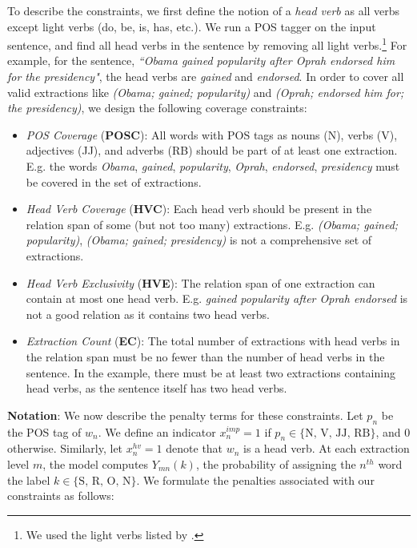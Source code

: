 \documentclass[11pt,a4paper]{article}
\begin{document}
To describe the constraints, we first define the notion of a \emph{head verb} as all verbs except light verbs (do, be, is, has, etc.). We run a POS tagger on the input sentence, and find all head verbs in the sentence by removing all light verbs.\footnote{We used the light verbs listed by \citet{jain&al16}.}  For example, for the sentence, \textit{``Obama gained popularity after Oprah endorsed him for the presidency"}, the head verbs are \textit{gained} and \textit{endorsed}. In order to cover all 
valid
extractions like \textit{(Obama; gained; popularity)} and \textit{(Oprah; endorsed him for; the presidency)}, we design the following coverage constraints: 



\begin{itemize}
\item \textit{POS Coverage} (\textbf{POSC}): All words with POS tags as nouns (N), verbs (V), adjectives (JJ), and adverbs (RB) should be part of at least one extraction. 
E.g. the words \textit{Obama}, \textit{gained}, \textit{popularity}, \textit{Oprah}, \textit{endorsed}, \textit{presidency} must be covered in the set of extractions.

\item \textit{Head Verb Coverage} (\textbf{HVC}): Each head verb 
should be present in the relation span of some (but not too many) extractions.
E.g. \textit{(Obama; gained; popularity)}, \textit{(Obama; gained; presidency)} is not a comprehensive set of extractions.


\item \textit{Head Verb Exclusivity} (\textbf{HVE}): The relation span of one extraction can contain at most one head verb.
E.g. \textit{gained popularity after Oprah endorsed} is not a good relation as it contains two head verbs.

\item \textit{Extraction Count} (\textbf{EC}): The total number of extractions with head verbs in the relation span must be no fewer than the number of head verbs in the sentence.
In the example, there must be at least two extractions containing head verbs, as the sentence itself has two head verbs.
\end{itemize}

\noindent\textbf{Notation}: We now describe the penalty terms for these constraints. Let $p_n$ be the POS tag of $w_n$. We define an indicator $x^{imp}_n=1$ if $p_n\in \{\text{N, V, JJ, RB}\}$, and $0$ otherwise. Similarly, let $x_n^{hv}=1$ denote that $w_n$ is a head verb. At each extraction level $m$, the model computes $Y_{mn}(k)$, the probability of assigning the $n^{th}$ word the label $k \in \{\text{S, R, O, N}\}$.  We formulate the penalties associated with our constraints as follows:
\end{document}
